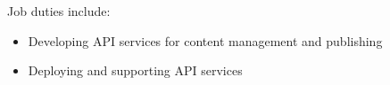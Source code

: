 \normalsize
Job duties include:
\small
\begin{itemize}
    \item Developing API services for content management and publishing
    \item Deploying and supporting API services
\end{itemize}
\normalsize
\medskip
